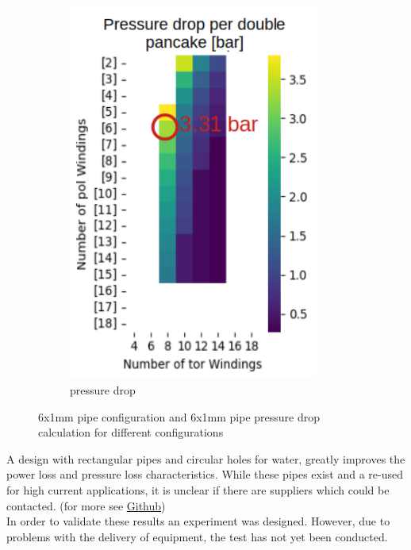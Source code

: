 \begin{figure}[h]
\begin{subfigure}[b]{0.3\textwidth}
        \includegraphics[width=0.9\textwidth]{Images/02_Coils/pressure.png}
        \caption{pressure drop}
        \label{fig:pressure}
    \end{subfigure}
    \caption{6x1mm pipe configuration and 6x1mm pipe pressure drop calculation for different configurations}
    \label{fig:both}
\end{figure}

A design with rectangular pipes and circular holes for water, greatly improves the power loss and pressure loss characteristics. %
While these pipes exist and a re-used for high current applications, it is unclear if there are suppliers which could be contacted. %
(for more see \href{https://github.com/LiigaSoolane/coil}{Github})\\
In order to validate these results an experiment was designed.
However, due to problems with the delivery of equipment, the test has not yet been conducted.\\
